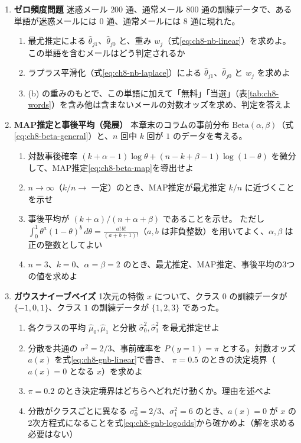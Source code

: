 \begin{enumerate}
  \item \textbf{ゼロ頻度問題}\quad
    迷惑メール $200$ 通、通常メール $800$ 通の訓練データで、ある単語が迷惑メールには $0$ 通、通常メールには $8$ 通に現れた。
    \begin{enumerate}
      \item 最尤推定による $\hat{\theta}_{j1}$、$\hat{\theta}_{j0}$ と、重み $w_j$（式\eqref{eq:ch8-nb-linear}）を求めよ。この単語を含むメールはどう判定されるか
      \item ラプラス平滑化（式\eqref{eq:ch8-nb-laplace}）による $\hat{\theta}_{j1}$、$\hat{\theta}_{j0}$ と $w_j$ を求めよ
      \item (b) の重みのもとで、この単語に加えて「無料」「当選」（表\ref{tab:ch8-words}）を含み他は含まないメールの対数オッズを求め、判定を答えよ
    \end{enumerate}

  \item \textbf{MAP推定と事後平均（発展）}\quad
    本章末のコラムの事前分布 $\mathrm{Beta}(\alpha, \beta)$（式\eqref{eq:ch8-beta-general}）と、$n$ 回中 $k$ 回が $1$ のデータを考える。
    \begin{enumerate}
      \item 対数事後確率 $(k + \alpha - 1)\log\theta + (n - k + \beta - 1)\log(1 - \theta)$ を微分して、MAP推定\eqref{eq:ch8-beta-map}を導出せよ
      \item $n \to \infty$（$k/n \to$ 一定）のとき、MAP推定が最尤推定 $k/n$ に近づくことを示せ
      \item 事後平均が $(k + \alpha)/(n + \alpha + \beta)$ であることを示せ。
        ただし $\int_0^1 \theta^a(1 - \theta)^b\,d\theta = \frac{a!\,b!}{(a + b + 1)!}$（$a, b$ は非負整数）を用いてよく、$\alpha, \beta$ は正の整数としてよい
      \item $n = 3$、$k = 0$、$\alpha = \beta = 2$ のとき、最尤推定、MAP推定、事後平均の3つの値を求めよ
    \end{enumerate}

  \item \textbf{ガウスナイーブベイズ}\quad
    1次元の特徴 $x$ について、クラス $0$ の訓練データが $\{-1, 0, 1\}$、クラス $1$ の訓練データが $\{1, 2, 3\}$ であった。
    \begin{enumerate}
      \item 各クラスの平均 $\hat{\mu}_0, \hat{\mu}_1$ と分散 $\hat{\sigma}_0^2, \hat{\sigma}_1^2$ を最尤推定せよ
      \item 分散を共通の $\sigma^2 = 2/3$、事前確率を $P(y = 1) = \pi$ とする。対数オッズ $a(x)$ を式\eqref{eq:ch8-gnb-linear}で書き、
        $\pi = 0.5$ のときの決定境界（$a(x) = 0$ となる $x$）を求めよ
      \item $\pi = 0.2$ のとき決定境界はどちらへどれだけ動くか。理由を述べよ
      \item 分散がクラスごとに異なる $\sigma_0^2 = 2/3$、$\sigma_1^2 = 6$ のとき、$a(x) = 0$ が $x$ の2次方程式になることを式\eqref{eq:ch8-gnb-logodds}から確かめよ（解を求める必要はない）
    \end{enumerate}


\end{enumerate}

